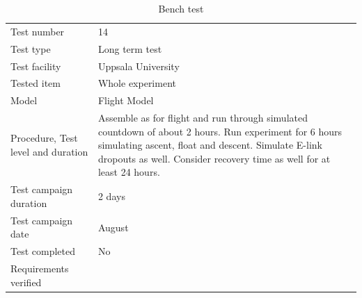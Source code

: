 \documentclass[
  a4paper,
  11pt,
  openany,
  parskip,
  toc=totoc,
  listof=totoc,
  bibliography=totoc
]{scrreprt}
\begin{document}
\begin{table}[H]
\centering
\caption{Bench test}
\label{tab:test_bench}
\begin{tabular}{L{5cm}L{10cm}}
\toprule
Test number & 14 \\
Test type & Long term test \\
Test facility & Uppsala University \\
Tested item & Whole experiment \\
Model & Flight Model \\
Procedure, Test level and duration & Assemble as for flight and run through simulated countdown of about 2 hours. Run experiment for 6 hours simulating ascent, float and descent. Simulate E-link dropouts as well. Consider recovery time as well for at least 24 hours. \\
Test campaign duration & 2 days \\
Test campaign date & August \\
Test completed & No \\
Requirements verified & \\
\bottomrule
\end{tabular}
\end{table}



\end{document}
